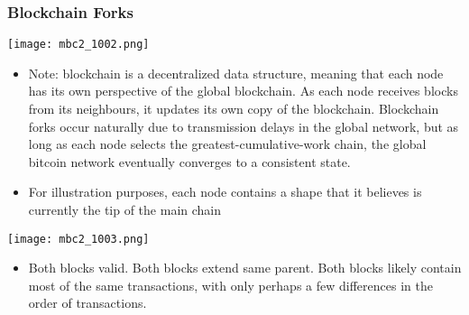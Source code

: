 \documentclass[english, 11pt]{article}
\begin{document}
\subsubsection{Blockchain Forks}
\begin{tcolorbox}
\begin{minipage}{0.45\linewidth}
    \texttt{[image: mbc2\_1002.png]}
    \label{fig:fig2}  
\end{minipage}\hfil
\begin{minipage}{0.45\linewidth}
\begin{itemize}
    \item Note: blockchain is a decentralized data structure, meaning that each node has its own perspective of the global blockchain. As each node receives blocks from its neighbours, it updates its own copy of the blockchain. Blockchain forks occur naturally due to transmission delays in the global network, but as long as each node selects the greatest-cumulative-work chain, the global bitcoin network eventually converges to a consistent state.
    \item For illustration purposes, each node contains a shape that it believes is currently the tip of the main chain
\end{itemize}
\end{minipage}
\end{tcolorbox}

\begin{tcolorbox}
\begin{minipage}{0.45\linewidth}
    \texttt{[image: mbc2\_1003.png]}
    \label{fig:fig1}  
\end{minipage}\hfil
\begin{minipage}{0.45\linewidth}
\begin{itemize}
    \item Both blocks valid. Both blocks extend same parent. Both blocks likely contain most of the same transactions, with only perhaps a few differences in the order of transactions.
\end{itemize}
\end{minipage}
\end{tcolorbox}
\end{document}
